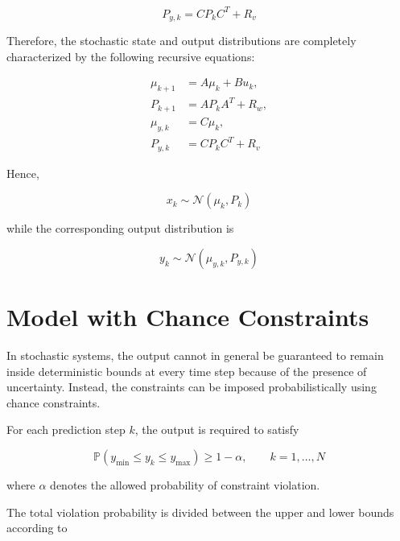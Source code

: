 \begin{equation}
    \boxed{
    P_{y,k}
    =
    CP_kC^T+R_v
    }
    \label{eq:output_covariance}
\end{equation}

Therefore, the stochastic state and output distributions are completely characterized by the following recursive equations:

\begin{align}
    \mu_{k+1} &= A\mu_k+Bu_k,\\
    P_{k+1} &= AP_kA^T+R_w,\\
    \mu_{y,k} &= C\mu_k,\\
    P_{y,k} &= CP_kC^T+R_v
\end{align}

Hence,

\begin{equation}
    x_k \sim \mathcal{N}(\mu_k,P_k)
\end{equation}

while the corresponding output distribution is

\begin{equation}
    y_k
    \sim
    \mathcal{N}
    \left(
        \mu_{y,k},
        P_{y,k}
    \right)
\end{equation}

\section{Model with Chance Constraints}
\label{sec:stochastic_chance_constraints}

In stochastic systems, the output cannot in general be guaranteed to remain inside deterministic bounds at every time step because of the presence of uncertainty. Instead, the constraints can be imposed probabilistically using chance constraints.

For each prediction step \(k\), the output is required to satisfy

\begin{equation}
    \mathbb{P}
    \left(
        y_{\min}
        \leq
        y_k
        \leq
        y_{\max}
    \right)
    \geq
    1-\alpha,
    \qquad
    k=1,\ldots,N
    \label{eq:chance_constraint}
\end{equation}

where \(\alpha\) denotes the allowed probability of constraint violation.

The total violation probability is divided between the upper and lower bounds according to


